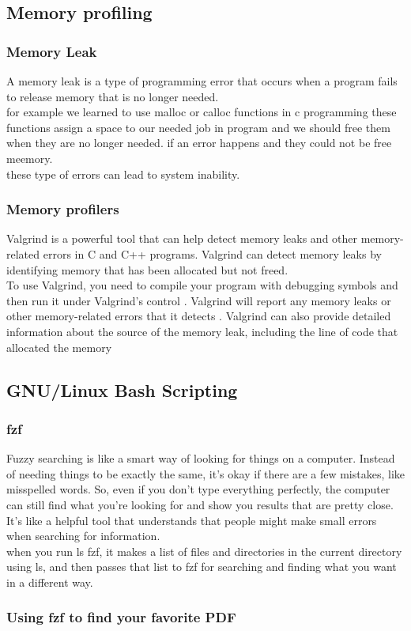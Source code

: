 \documentclass{article}
\begin{document}
\subsection{Memory profiling}
\subsubsection{Memory Leak}
A memory leak is a type of programming error that occurs when a program fails to release memory that is no longer needed.\\for example we learned to use malloc or calloc functions in c programming these functions assign a space to our needed job in program and we should free them when they are no longer needed. if an error happens and they could not be free meemory.\\
these type of errors can lead to system inability.
\subsubsection{Memory profilers}
Valgrind is a powerful tool that can help detect memory leaks and other memory-related errors in C and C++ programs. Valgrind can detect memory leaks by identifying memory that has been allocated but not freed.\\To use Valgrind, you need to compile your program with debugging symbols and then run it under Valgrind’s control . Valgrind will report any memory leaks or other memory-related errors that it detects . Valgrind can also provide detailed information about the source of the memory leak, including the line of code that allocated the memory 
\subsection{GNU/Linux Bash Scripting}
\subsubsection{fzf}
Fuzzy searching is like a smart way of looking for things on a computer. Instead of needing things to be exactly the same, it's okay if there are a few mistakes, like misspelled words. So, even if you don't type everything perfectly, the computer can still find what you're looking for and show you results that are pretty close. It's like a helpful tool that understands that people might make small errors when searching for information.\\
when you run ls  fzf, it makes a list of files and directories in the current directory using ls, and then passes that list to fzf for searching and finding what you want in a different way.
\subsubsection{Using fzf to find your favorite PDF}
\end{document}
